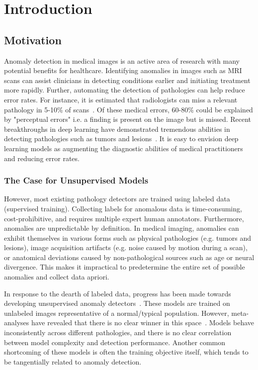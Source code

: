 \chapter{Introduction}

\section{Motivation}

Anomaly detection in medical images is an active area of research with many potential benefits for healthcare. Identifying anomalies in images such as MRI scans can assist clinicians in detecting conditions earlier and initiating treatment more rapidly. Further, automating the detection of pathologies can help reduce error rates. For instance, it is estimated that radiologists can miss a relevant pathology in 5-10\% of scans~\cite{bruno_understanding_2015}. Of these medical errors, 60-80\% could be explained by "perceptual errors" i.e. a finding is present on the image but is missed. Recent breakthroughs in deep learning have demonstrated tremendous abilities in detecting pathologies such as tumors and lesions~\cite{kim_deep_2019,lee_deep_2017}. It is easy to envision deep learning models as augmenting the diagnostic abilities of medical practitioners and reducing error rates.


\subsection*{The Case for Unsupervised Models}

However, most existing pathology detectors are trained using labeled data (supervised training). Collecting labels for anomalous data is time-consuming, cost-prohibitive, and requires multiple expert human annotators.  Furthermore, anomalies are unpredictable by definition. In medical imaging, anomalies can exhibit themselves in various forms such as physical pathologies (e.g. tumors and lesions), image acquisition artifacts (e.g. noise caused by motion during a scan), or anatomical deviations caused by non-pathological sources such as age or neural divergence.
This makes it impractical to predetermine the entire set of possible anomalies and collect data apriori.

In response to the dearth of labeled data, progress has been made towards developing unsupervised anomaly detectors~\cite{bergmann2020uninformed,baur_deep_2019,ruff_unifying_2021}. These models are trained on unlabeled images representative of a normal/typical population.
However, meta-analyses have revealed that there is no clear winner in this space~\cite{baur2021,ruff_unifying_2021}. Models behave inconsistently across different pathologies, and there is no clear correlation between model complexity and detection performance. Another common shortcoming of these models is often the training objective itself, which tends to be tangentially related to anomaly detection.

